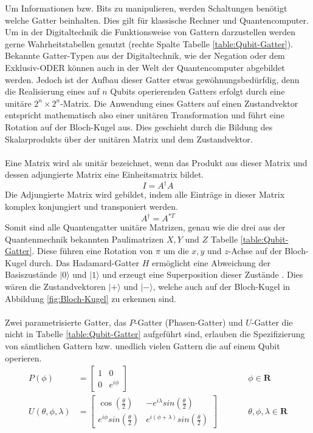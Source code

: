 Um Informationen bzw. Bits zu manipulieren, werden Schaltungen ben\"otigt welche Gatter beinhalten. Dies gilt f\"ur klassische Rechner und Quantencomputer. Um in der Digitaltechnik die Funktionsweise von Gattern darzustellen werden gerne Wahrheitstabellen genutzt (rechte Spalte Tabelle \ref{table:Qubit-Gatter}). Bekannte Gatter-Typen aus der Digitaltechnik, wie der Negation oder dem Exklusiv-ODER k\"onnen auch in der Welt der Quantencomputer abgebildet werden. Jedoch ist der Aufbau dieser Gatter etwas gew\"ohnungsbed\"urfdig, denn die Realisierung eines auf $n$ Qubits operierenden Gatters erfolgt durch eine unit\"are $2^{n}\times 2^{n}$-Matrix. Die Anwendung eines Gatters auf einen Zustandvektor entspricht mathematisch also einer unit\"aren Transformation und f\"uhrt eine Rotation auf der Bloch-Kugel aus. Dies geschieht durch die Bildung des Skalarprodukts \"uber der unit\"aren Matrix und dem Zustandvektor. \\ \\
Eine Matrix wird als unit\"ar bezeichnet, wenn das Produkt aus dieser Matrix und dessen adjungierte Matrix eine Einheitsmatrix bildet.
\begin{equation}
  I = A^{\dagger} A
\end{equation}
Die Adjungierte Matrix wird gebildet, indem alle Eintr\"age in dieser Matrix komplex konjungiert und transponiert werden.
\begin{equation}
  A^{\dagger} = A^{*T}
\end{equation}
Somit sind alle Quantengatter unit\"are Matrizen, genau wie die drei aus der Quantenmechnik bekannten Paulimatrizen $X, Y$ und $Z$ Tabelle \ref{table:Qubit-Gatter}. Diese f\"uhren eine Rotation von $\pi$ um die $x, y$ und $z$-Achse auf der Bloch-Kugel durch. Das Hadamard-Gatter $H$ erm\"oglicht eine Abweichung der Basiszust\"ande $|0\rangle$ und $|1\rangle$ und erzeugt eine Superposition dieser Zust\"ande \cite{Qiskit-Textbook}.
Dies w\"aren die Zustandvektoren $|+\rangle$ und $|-\rangle$, welche auch auf der Bloch-Kugel in Abbildung \ref{fig:Bloch-Kugel} zu erkennen sind. \\ \\
Zwei parametrisierte Gatter, das $P$-Gatter (Phasen-Gatter) und $U$-Gatter die nicht in Tabelle \ref{table:Qubit-Gatter} aufgef\"uhrt sind, erlauben die Spezifizierung von s\"amtlichen Gattern bzw. unedlich vielen Gattern die auf einem Qubit operieren.
\begin{equation}
\begin{aligned}
P(\phi) &= \begin{bmatrix}1 & 0 \\ 0 & e^{i\phi} \end{bmatrix} &&\qquad \phi \in \mathbf{R}\\[1em]
U(\theta, \phi, \lambda) &= \begin{bmatrix} \cos\left(\frac{\theta}{2}\right) & -e^{i\lambda}sin\left(\frac{\theta}{2}\right) \\
e^{i\phi}sin\left(\frac{\theta}{2}\right) & e^{i(\phi+\lambda)}sin\left(\frac{\theta}{2}\right)
\end{bmatrix} &&\qquad \theta, \phi, \lambda \in \mathbf{R}
\end{aligned}
\end{equation}

